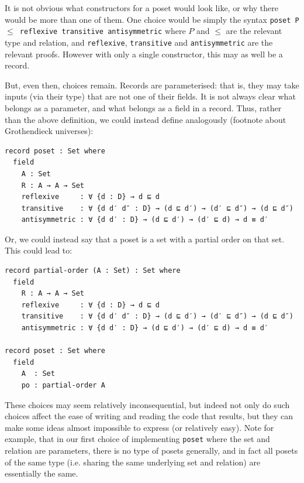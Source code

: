 \documentclass[12pt,a4paper,twoside,openright]{report}
\begin{document}
It is not obvious what constructors for a poset would look like, or why there would be more than one of them. One choice would be simply the syntax \texttt{poset P $\leq$ reflexive transitive antisymmetric} where $P$ and $\leq$ are the relevant type and relation, and \texttt{reflexive}, \texttt{transitive} and \texttt{antisymmetric} are the relevant proofs. However with only a single constructor, this may as well be a record. 

But, even then, choices remain. Records are parameterised: that is, they may take inputs (via their type) that are not one of their fields. It is not always clear what belongs as a parameter, and what belongs as a field in a record. Thus, rather than the above definition, we could instead define analogously (footnote about Grothendieck universes):
\begin{verbatim}
record poset : Set where
  field
    A : Set
    R : A → A → Set
    reflexive     : ∀ {d : D} → d ⊑ d 
    transitive    : ∀ {d d′ d″ : D} → (d ⊑ d′) → (d′ ⊑ d″) → (d ⊑ d″)
    antisymmetric : ∀ {d d′ : D} → (d ⊑ d′) → (d′ ⊑ d) → d ≡ d′
\end{verbatim}

Or, we could instead say that a poset is a set with a partial order on that set. This could lead to:
\begin{verbatim}
record partial-order (A : Set) : Set where
  field
    R : A → A → Set
    reflexive     : ∀ {d : D} → d ⊑ d 
    transitive    : ∀ {d d′ d″ : D} → (d ⊑ d′) → (d′ ⊑ d″) → (d ⊑ d″)
    antisymmetric : ∀ {d d′ : D} → (d ⊑ d′) → (d′ ⊑ d) → d ≡ d′

record poset : Set where
  field
    A  : Set
    po : partial-order A
\end{verbatim}

These choices may seem relatively inconsequential, but indeed not only do such choices affect the ease of writing and reading the code that results, but they can make some ideas almost impossible to express (or relatively easy). Note for example, that in our first choice of implementing \texttt{poset} where the set and relation are parameters, there is no type of posets generally, and in fact all posets of the same type (i.e. sharing the same underlying set and relation) are essentially the same. 
\end{document}
